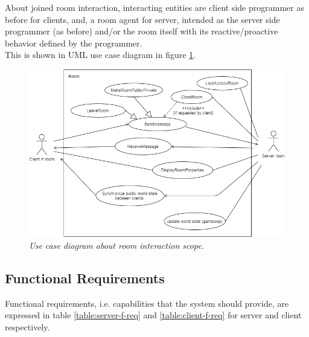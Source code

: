 \bigskip
About joined room interaction, interacting entities are client side programmer as before for clients, and, a room agent for server, intended as the server side programmer (as before) and/or the room itself with its reactive/proactive behavior defined by the programmer. 
\\
This is shown in UML use case diagram in figure \ref{fig:room-use_cases}.
\begin{figure}[H]
  \includegraphics[scale=0.5]{images/2-scoping/room-use_cases.png}
   \centering  
   \caption{\textit{Use case diagram about room interaction scope.}}
  \label{fig:room-use_cases}
\end{figure} 
 
\subsection{Functional Requirements}

Functional requirements, i.e. capabilities that the system should provide, are expressed in table \ref{table:server-f-req} and \ref{table:client-f-req} for server and client respectively.

